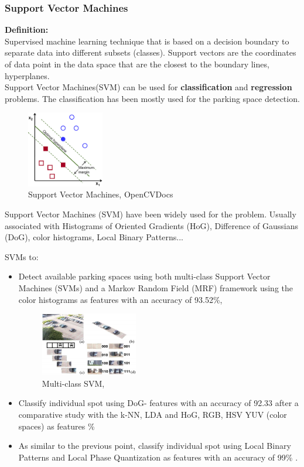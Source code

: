 \documentclass{beamer}
\begin{document}
\begin{frame}[allowframebreaks]
\frametitle{Support Vector Machines}
\textbf{Definition:}\\
Supervised machine learning technique that is based on a decision boundary to separate data into different subsets (classes). Support vectors are the coordinates of data point in the data space that are the closest to the boundary lines, hyperplanes.\\
Support Vector Machines(SVM) can be used for \textbf{classification} and \textbf{regression} problems. The classification has been mostly used for the parking space detection.

\begin{figure}[h!]
	\centering
	\includegraphics[width=0.3\textwidth]{Pictures/SVM}
	\caption{Support Vector Machines, OpenCVDocs}
\end{figure}

Support Vector Machines (SVM) have been widely used for the problem. Usually associated with Histograms of Oriented Gradients (HoG), Difference of Gaussians (DoG), color histograms, Local Binary Patterns...

SVMs to:

\begin{itemize}
	\item Detect available parking spaces using both multi-class Support Vector Machines (SVMs) and a Markov Random Field (MRF) framework using the color histograms as features \cite{wu} with an accuracy of 93.52\%,
	\begin{figure}[h!]
		\centering
		\includegraphics[width=0.4\textwidth]{Pictures/Wu}
		\caption{Multi-class SVM, \cite{wu}}
	\end{figure}
	\item Classify individual spot using DoG- features with an accuracy of 92.33 after a comparative study with the k-NN, LDA and HoG, RGB, HSV YUV (color spaces) as features \cite{Tschentscher}\%
	\item As similar to the previous point, classify individual spot using Local Binary Patterns and Local Phase Quantization as features with an accuracy of 99\% \cite{deAlmeida}.
	

\end{itemize}
\end{frame}
\end{document}
